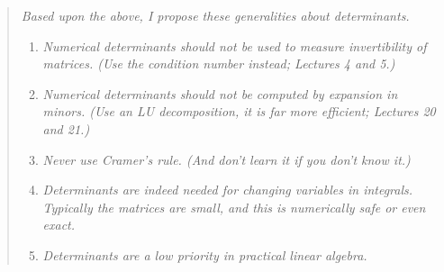 \documentclass[12pt]{amsart}
\begin{document}
\medskip
\begin{quotation}
\emph{Based upon the above, I propose these generalities about determinants.}

\smallskip
\renewcommand{\labelenumi}{\arabic{enumi}.}
\begin{enumerate}
\setlength\itemsep{5pt}
\item \emph{Numerical determinants should not be used to measure invertibility of matrices.  (Use the condition number instead; Lectures 4 and 5.)}
\item \emph{Numerical determinants should not be computed by expansion in minors.  (Use an LU decomposition, it is far more efficient; Lectures 20 and 21.)}
\item \emph{Never use Cramer's rule.  (And don't learn it if you don't know it.)}
\item \emph{Determinants \emph{are} indeed needed for changing variables in integrals.  Typically the matrices are small, and this is numerically safe or even exact.}
\item \emph{Determinants are a low priority in practical linear algebra.}
\end{enumerate}
\end{quotation}
\end{document}
